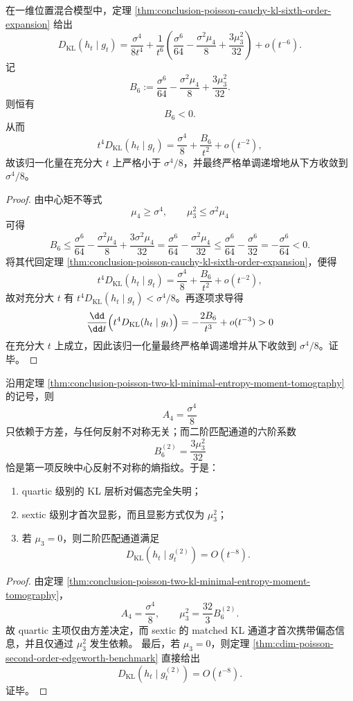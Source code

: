 \begin{theorem}\label{thm:conclusion-poisson-kl-sixth-coefficient-negative-monotone-approach}
在一维位置混合模型中，定理 \ref{thm:conclusion-poisson-cauchy-kl-sixth-order-expansion} 给出
\[
D_{\mathrm{KL}}(h_t\mid g_t)
=
\frac{\sigma^4}{8t^4}
+
\frac{1}{t^6}
\left(
\frac{\sigma^6}{64}
-\frac{\sigma^2\mu_4}{8}
+\frac{3\mu_3^2}{32}
\right)
+o(t^{-6}).
\]
记
\[
B_6:=\frac{\sigma^6}{64}-\frac{\sigma^2\mu_4}{8}+\frac{3\mu_3^2}{32}.
\]
则恒有
\[
B_6<0.
\]
从而
\[
t^4D_{\mathrm{KL}}(h_t\mid g_t)=\frac{\sigma^4}{8}+\frac{B_6}{t^2}+o(t^{-2}),
\]
故该归一化量在充分大 \(t\) 上严格小于 \(\sigma^4/8\)，并最终严格单调递增地从下方收敛到 \(\sigma^4/8\)。
\end{theorem}
\begin{proof}
由中心矩不等式
\[
\mu_4\ge \sigma^4,
\qquad
\mu_3^2\le \sigma^2\mu_4
\]
可得
\[
B_6
\le
\frac{\sigma^6}{64}
-\frac{\sigma^2\mu_4}{8}
+\frac{3\sigma^2\mu_4}{32}
=
\frac{\sigma^6}{64}-\frac{\sigma^2\mu_4}{32}
\le
\frac{\sigma^6}{64}-\frac{\sigma^6}{32}
=
-\frac{\sigma^6}{64}<0.
\]
将其代回定理 \ref{thm:conclusion-poisson-cauchy-kl-sixth-order-expansion}，便得
\[
t^4D_{\mathrm{KL}}(h_t\mid g_t)=\frac{\sigma^4}{8}+\frac{B_6}{t^2}+o(t^{-2}),
\]
故对充分大 \(t\) 有 \(t^4D_{\mathrm{KL}}(h_t\mid g_t)<\sigma^4/8\)。再逐项求导得
\[
\frac{\dd}{\dd t}\Bigl(t^4D_{\mathrm{KL}}(h_t\mid g_t)\Bigr)
=
-\frac{2B_6}{t^3}+o(t^{-3})>0
\]
在充分大 \(t\) 上成立，因此该归一化量最终严格单调递增并从下收敛到 \(\sigma^4/8\)。证毕。
\end{proof}

\begin{corollary}\label{cor:conclusion-poisson-skewness-first-enters-at-sextic}
沿用定理 \ref{thm:conclusion-poisson-two-kl-minimal-entropy-moment-tomography} 的记号，则
\[
A_4=\frac{\sigma^4}{8}
\]
只依赖于方差，与任何反射不对称无关；而二阶匹配通道的六阶系数
\[
B_6^{(2)}=\frac{3\mu_3^2}{32}
\]
恰是第一项反映中心反射不对称的熵指纹。于是：
\begin{enumerate}
  \item quartic 级别的 KL 层析对偏态完全失明；
  \item sextic 级别才首次显影，而且显影方式仅为 \(\mu_3^2\)；
  \item 若 \(\mu_3=0\)，则二阶匹配通道满足
  \[
  D_{\mathrm{KL}}(h_t\mid g_t^{(2)})=O(t^{-8}).
  \]
\end{enumerate}
\end{corollary}
\begin{proof}
由定理 \ref{thm:conclusion-poisson-two-kl-minimal-entropy-moment-tomography}，
\[
A_4=\frac{\sigma^4}{8},
\qquad
\mu_3^2=\frac{32}{3}B_6^{(2)}.
\]
故 quartic 主项仅由方差决定，而 sextic 的 matched KL 通道才首次携带偏态信息，并且仅通过 \(\mu_3^2\) 发生依赖。
最后，若 \(\mu_3=0\)，则定理 \ref{thm:cdim-poisson-second-order-edgeworth-benchmark} 直接给出
\[
D_{\mathrm{KL}}(h_t\mid g_t^{(2)})=O(t^{-8}).
\]
证毕。
\end{proof}

